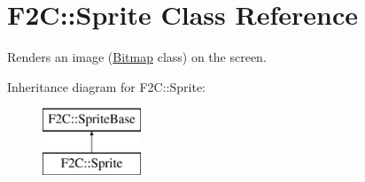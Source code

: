 \hypertarget{class_f2_c_1_1_sprite}{
\section{F2C::Sprite Class Reference}
\label{class_f2_c_1_1_sprite}
}


Renders an image (\hyperlink{class_f2_c_1_1_bitmap}{Bitmap} class) on the screen.  


Inheritance diagram for F2C::Sprite:\begin{figure}[H]
\begin{center}
\leavevmode
\includegraphics[height=2.000000cm]{class_f2_c_1_1_sprite}
\end{center}
\end{figure}
